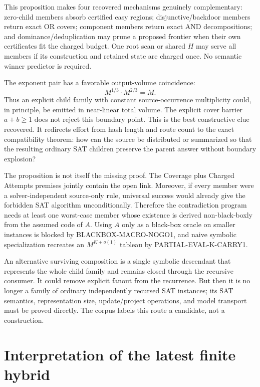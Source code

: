 \documentclass[10pt]{article}
\begin{document}
This proposition makes four recovered mechanisms genuinely complementary:
zero-child members absorb certified easy regions; disjunctive/backdoor members
return exact OR covers; component members return exact AND decompositions;
and dominance/deduplication may prune a proposed frontier when their own
certificates fit the charged budget.  One root scan or shared $H$ may serve all
members if its construction and retained state are charged once.  No semantic
winner predictor is required.

The exponent pair has a favorable output-volume coincidence:
\[
 M^{1/3}\cdot M^{2/3}=M.
\]
Thus an explicit child family with constant source-occurrence multiplicity
could, in principle, be emitted in near-linear total volume.  The explicit
cover barrier $a+b\ge1$ does not reject this boundary point.  This is the best
constructive clue recovered.  It redirects effort from hash length and route
count to the exact compatibility theorem: how can the source be distributed
or summarized so that the resulting ordinary SAT children preserve the
parent answer without boundary explosion?

The proposition is not itself the missing proof.  The Coverage plus Charged
Attempts premises jointly contain the open link.  Moreover, if every member
were a solver-independent source-only rule, universal success would already
give the forbidden SAT algorithm unconditionally.  Therefore the
contradiction program needs at least one worst-case member whose existence is
derived non-black-boxly from the assumed code of $A$.  Using $A$ only as a
black-box oracle on smaller instances is blocked by BLACKBOX-MACRO-NOGO1, and
naive symbolic specialization recreates an $M^{K+o(1)}$ tableau by
PARTIAL-EVAL-K-CARRY1.

An alternative surviving composition is a single symbolic descendant that
represents the whole child family and remains closed through the recursive
consumer.  It could remove explicit fanout from the recurrence.  But then it
is no longer a family of ordinary independently recursed SAT instances; its
SAT semantics, representation size, update/project operations, and model
transport must be proved directly.  The corpus labels this route a candidate,
not a construction.

\section{Interpretation of the latest finite hybrid}
\end{document}
